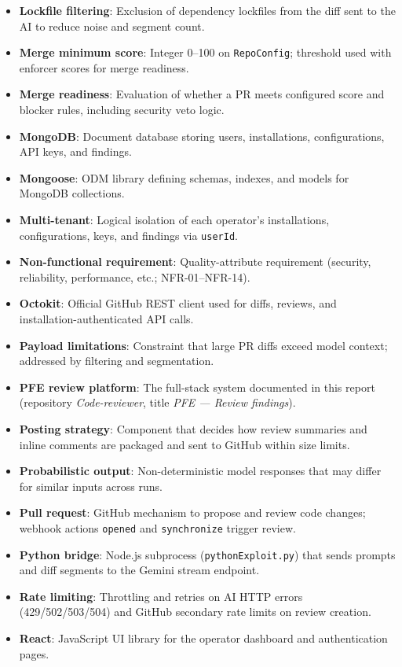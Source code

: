 \begin{itemize}
\item \textbf{Lockfile filtering}: Exclusion of dependency lockfiles from the diff sent to the AI to reduce noise and segment count.
\item \textbf{Merge minimum score}: Integer 0--100 on \texttt{RepoConfig}; threshold used with enforcer scores for merge readiness.
\item \textbf{Merge readiness}: Evaluation of whether a PR meets configured score and blocker rules, including security veto logic.
\item \textbf{MongoDB}: Document database storing users, installations, configurations, API keys, and findings.
\item \textbf{Mongoose}: ODM library defining schemas, indexes, and models for MongoDB collections.
\item \textbf{Multi-tenant}: Logical isolation of each operator's installations, configurations, keys, and findings via \texttt{userId}.
\item \textbf{Non-functional requirement}: Quality-attribute requirement (security, reliability, performance, etc.; NFR-01--NFR-14).
\item \textbf{Octokit}: Official GitHub REST client used for diffs, reviews, and installation-authenticated API calls.
\item \textbf{Payload limitations}: Constraint that large PR diffs exceed model context; addressed by filtering and segmentation.
\item \textbf{PFE review platform}: The full-stack system documented in this report (repository \textit{Code-reviewer}, title \textit{PFE --- Review findings}).
\item \textbf{Posting strategy}: Component that decides how review summaries and inline comments are packaged and sent to GitHub within size limits.
\item \textbf{Probabilistic output}: Non-deterministic model responses that may differ for similar inputs across runs.
\item \textbf{Pull request}: GitHub mechanism to propose and review code changes; webhook actions \texttt{opened} and \texttt{synchronize} trigger review.
\item \textbf{Python bridge}: Node.js subprocess (\texttt{pythonExploit.py}) that sends prompts and diff segments to the Gemini stream endpoint.
\item \textbf{Rate limiting}: Throttling and retries on AI HTTP errors (429/502/503/504) and GitHub secondary rate limits on review creation.
\item \textbf{React}: JavaScript UI library for the operator dashboard and authentication pages.

\end{itemize}

